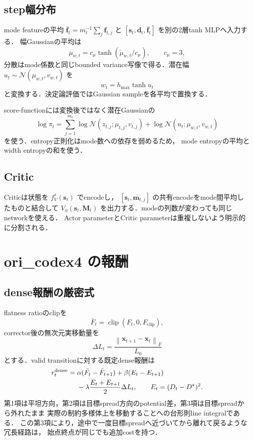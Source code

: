 \documentclass[a4paper,11pt]{ltjsarticle}
\newcommand{\norm}[1]{\left\lVert #1\right\rVert}
\newcommand{\clip}{\operatorname{clip}}
\begin{document}
\subsection{step幅分布}

mode featureの平均
$\bar{\bm f}_t=m_t^{-1}\sum_j\bm f_{t,j}$ と
$[\bm s_t,\bm d_t,\bar{\bm f}_t]$ を別の2層tanh MLPへ入力する．
幅Gaussianの平均は
\begin{equation}
  \mu_{w,t}=c_\mu\tanh(\tilde\mu_{w,t}/c_\mu),
  \qquad c_\mu=3,
\end{equation}
分散はmode係数と同じbounded variance写像で得る．潜在幅
$u_t\sim\mathcal N(\mu_{w,t},v_{w,t})$ を
\begin{equation}
  w_t=h_{\max}\tanh u_t
  \label{eq:width}
\end{equation}
と変換する．決定論評価ではGaussian sampleを各平均で置換する．

score-functionには変換後ではなく潜在Gaussianの
\begin{equation}
  \log\pi_t=\sum_{j=1}^{m_t}\log\mathcal N(z_{t,j};\mu_{t,j},v_{t,j})
  +\log\mathcal N(u_t;\mu_{w,t},v_{w,t})
\end{equation}
を使う．entropy正則化はmode数への依存を弱めるため，
mode entropyの平均とwidth entropyの和を使う．

\subsection{Critic}

Criticは状態を $f_V^s(\bm s_t)$ でencodeし，
$[\bm s_t,\bm m_{t,j}]$ の共有encodeをmode間平均したものと結合して
$V_\phi(\bm s_t,\bm M_t)$ を出力する．modeの列数が変わっても同じnetworkを使える．
Actor parameterとCritic parameterは重複しないよう明示的に分割される．

\section{ori\_codex4 の報酬}
\label{sec:reward}

\subsection{dense報酬の厳密式}

flatness ratioのclipを
\begin{equation}
  \bar F_t=\clip(F_t,0,F_{\mathrm{clip}}),
\end{equation}
corrector後の無次元実移動量を
\begin{equation}
  \Delta L_t=\frac{\norm{\bm x_{t+1}-\bm x_t}_F}{L_0}
\end{equation}
とする．valid transitionに対する既定dense報酬は
\begin{align}
 r_t^{\mathrm{dense}}
 ={}&\alpha(\bar F_t-\bar F_{t+1})
 +\beta(E_t-E_{t+1}) \notag\\
 &-\lambda\frac{E_t+E_{t+1}}{2}\Delta L_t,
 \qquad E_t=(D_t-D^\star)^2.
 \label{eq:dense}
\end{align}
第1項は平坦方向，第2項は目標spread方向のpotential差，第3項は目標spreadから外れたまま
実際の制約多様体上を移動することへの台形則line integralである．
この第3項により，途中で一度目標spreadへ近づいてから離れて戻るような冗長経路は，
始点終点が同じでも追加costを持つ．
\end{document}
